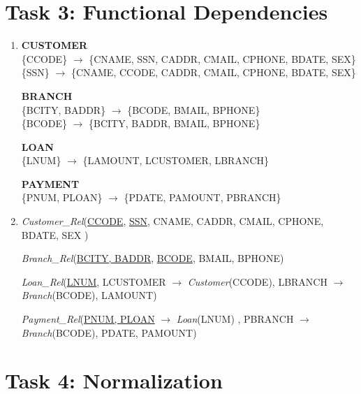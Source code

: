 \documentclass[12pt,letterpaper]{article}
\begin{document}
\section*{Task 3: Functional Dependencies}
\begin{enumerate}[label={3.\arabic*},nolistsep,leftmargin=*]
\item
    \textbf{CUSTOMER} \\
    \{CCODE\} $\longrightarrow$ \{CNAME, SSN, CADDR, CMAIL, CPHONE, BDATE, SEX\}\\
    \{SSN\} $\longrightarrow$ \{CNAME, CCODE, CADDR, CMAIL, CPHONE, BDATE, SEX\}
    
    \textbf{BRANCH} \\
    \{BCITY, BADDR\} $\longrightarrow$ \{BCODE, BMAIL, BPHONE\}\\
    \{BCODE\} $\longrightarrow$ \{BCITY, BADDR, BMAIL, BPHONE\}
    
    \textbf{LOAN}\\
    \{LNUM\} $\longrightarrow$ \{LAMOUNT, LCUSTOMER, LBRANCH\}
    
    \textbf{PAYMENT}\\
    \{PNUM, PLOAN\} $\longrightarrow$ \{PDATE, PAMOUNT, PBRANCH\}\\

\item
    \textit{Customer\_Rel}(\underline{CCODE}, \underline{SSN}, CNAME, CADDR, CMAIL, CPHONE, BDATE, SEX )
    
    \textit{Branch\_Rel}(\underline{BCITY, BADDR}, \underline{BCODE}, BMAIL, BPHONE)
    
    \textit{Loan\_Rel}(\underline{LNUM}, LCUSTOMER $\longrightarrow$ \textit{Customer}(CCODE), LBRANCH $\longrightarrow$ \textit{Branch}(BCODE), LAMOUNT)
    
    \textit{Payment\_Rel}(\underline{PNUM, PLOAN} $\longrightarrow$ \textit{Loan}(LNUM) , PBRANCH $\longrightarrow$ \textit{Branch}(BCODE), PDATE, PAMOUNT)
    
\end{enumerate}

\section*{Task 4: Normalization}
\end{document}
